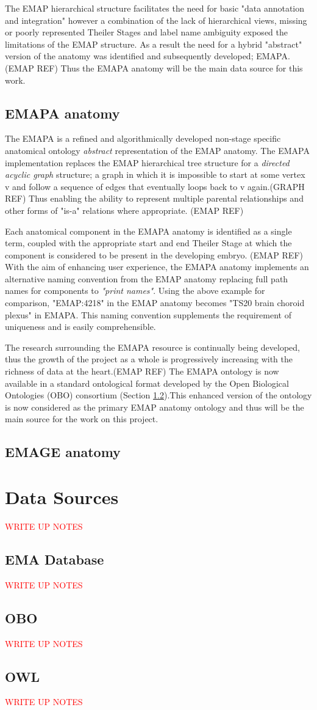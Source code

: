 The EMAP hierarchical structure facilitates the need for basic "data annotation and integration" however a combination of the lack of hierarchical views, missing or poorly represented Theiler Stages and label name ambiguity exposed the limitations of the EMAP structure. As a result the need for a hybrid "abstract" version of the anatomy was identified and subsequently developed; EMAPA. (EMAP REF) Thus the EMAPA anatomy will be the main data source for this work.

\subsection{EMAPA anatomy}
The EMAPA is a refined and algorithmically developed non-stage specific anatomical ontology \textit{abstract} representation of the EMAP anatomy. The EMAPA implementation replaces the EMAP hierarchical tree structure for a \textit{directed acyclic graph} structure; a graph in which it is impossible to start at some vertex v and follow a sequence of edges that eventually loops back to v again.(GRAPH REF) Thus enabling the ability to represent multiple parental relationships and other forms of "is-a" relations where appropriate. (EMAP REF)

Each anatomical component in the EMAPA anatomy is identified as a single term, coupled with the appropriate start and end Theiler Stage at which the component is considered to be present in the developing embryo. (EMAP REF) With the aim of enhancing user experience, the EMAPA anatomy  implements an alternative naming convention from the EMAP anatomy replacing full path names for components to \textit{"print names"}. Using the above example for comparison, "EMAP:4218" in the EMAP anatomy becomes "TS20 brain choroid plexus" in EMAPA. This naming convention supplements the requirement of uniqueness and is easily comprehensible.

The research surrounding the EMAPA resource is continually being developed, thus the growth of the project as a whole is progressively increasing with the richness of data at the heart.(EMAP REF) The EMAPA ontology is now available in a standard ontological format developed by the Open Biological Ontologies (OBO) consortium (Section \ref{obo}).This enhanced version of the ontology is now considered as the primary EMAP anatomy ontology and thus will be the main source for the work on this project.


\subsection{EMAGE anatomy}
\section{Data Sources}
\textcolor{red}{WRITE UP NOTES}
\subsection{EMA Database}
\textcolor{red}{WRITE UP NOTES}
\subsection{OBO}\label{obo}
\textcolor{red}{WRITE UP NOTES}
\subsection{OWL}
\textcolor{red}{WRITE UP NOTES}

